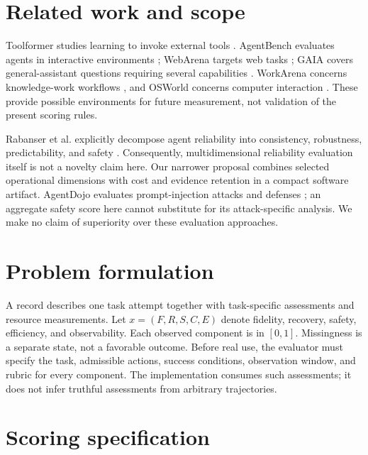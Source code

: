 \documentclass[11pt]{article}
\begin{document}
\section{Related work and scope}
Toolformer studies learning to invoke external tools \cite{schick2023toolformer}. AgentBench evaluates agents in interactive environments \cite{liu2024agentbench}; WebArena targets web tasks \cite{zhou2024webarena}; GAIA covers general-assistant questions requiring several capabilities \cite{mialon2024gaia}. WorkArena concerns knowledge-work workflows \cite{drouin2024workarena}, and OSWorld concerns computer interaction \cite{xie2024osworld}. These provide possible environments for future measurement, not validation of the present scoring rules.

Rabanser et al. explicitly decompose agent reliability into consistency, robustness, predictability, and safety \cite{rabanser2026reliability}. Consequently, multidimensional reliability evaluation itself is not a novelty claim here. Our narrower proposal combines selected operational dimensions with cost and evidence retention in a compact software artifact. AgentDojo evaluates prompt-injection attacks and defenses \cite{debenedetti2024agentdojo}; an aggregate safety score here cannot substitute for its attack-specific analysis. We make no claim of superiority over these evaluation approaches.

\section{Problem formulation}
A record describes one task attempt together with task-specific assessments and resource measurements. Let $x=(F,R,S,C,E)$ denote fidelity, recovery, safety, efficiency, and observability. Each observed component is in $[0,1]$. Missingness is a separate state, not a favorable outcome. Before real use, the evaluator must specify the task, admissible actions, success conditions, observation window, and rubric for every component. The implementation consumes such assessments; it does not infer truthful assessments from arbitrary trajectories.

\section{Scoring specification}
\end{document}
